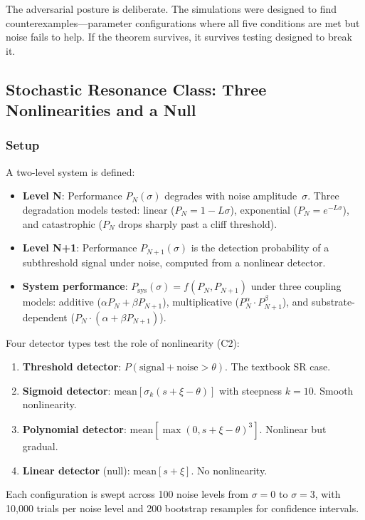 \documentclass[12pt,letterpaper]{article}
\theoremstyle{definition}
\theoremstyle{remark}
\newcommand{\Psys}{P_{\text{sys}}}
\newcommand{\Pn}{P_N}
\newcommand{\Pnp}{P_{N+1}}
\begin{document}
The adversarial posture is deliberate. The simulations were designed to find counterexamples---parameter configurations where all five conditions are met but noise fails to help. If the theorem survives, it survives testing designed to break it.

\subsection{Stochastic Resonance Class: Three Nonlinearities and a Null}

\subsubsection{Setup}

A two-level system is defined:
\begin{itemize}
    \item \textbf{Level N}: Performance $\Pn(\sigma)$ degrades with noise amplitude~$\sigma$. Three degradation models tested: linear ($\Pn = 1 - L\sigma$), exponential ($\Pn = e^{-L\sigma}$), and catastrophic ($\Pn$ drops sharply past a cliff threshold).
    \item \textbf{Level N+1}: Performance $\Pnp(\sigma)$ is the detection probability of a subthreshold signal under noise, computed from a nonlinear detector.
    \item \textbf{System performance}: $\Psys(\sigma) = f(\Pn, \Pnp)$ under three coupling models: additive ($\alpha \Pn + \beta \Pnp$), multiplicative ($\Pn^\alpha \cdot \Pnp^\beta$), and substrate-dependent ($\Pn \cdot (\alpha + \beta \Pnp)$).
\end{itemize}

Four detector types test the role of nonlinearity (C2):
\begin{enumerate}
    \item \textbf{Threshold detector}: $P(\text{signal} + \text{noise} > \theta)$. The textbook SR case.
    \item \textbf{Sigmoid detector}: $\text{mean}[\sigma_k(s + \xi - \theta)]$ with steepness $k = 10$. Smooth nonlinearity.
    \item \textbf{Polynomial detector}: $\text{mean}[\max(0, s + \xi - \theta)^3]$. Nonlinear but gradual.
    \item \textbf{Linear detector} (null): $\text{mean}[s + \xi]$. No nonlinearity.
\end{enumerate}

Each configuration is swept across 100 noise levels from $\sigma = 0$ to $\sigma = 3$, with 10{,}000 trials per noise level and 200 bootstrap resamples for confidence intervals.
\end{document}
